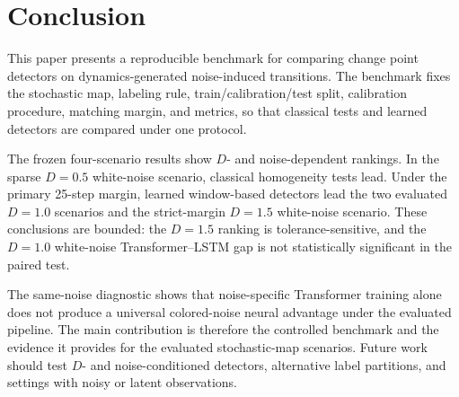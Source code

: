 \section{Conclusion}

This paper presents a reproducible benchmark for comparing change point
detectors on dynamics-generated noise-induced transitions. The benchmark fixes
the stochastic map, labeling rule, train/calibration/test split, calibration
procedure, matching margin, and metrics, so that classical tests and learned
detectors are compared under one protocol.

The frozen four-scenario results show \(D\)- and noise-dependent rankings. In
the sparse \(D=0.5\) white-noise scenario, classical homogeneity tests lead.
Under the primary 25-step margin, learned window-based detectors lead the two
evaluated \(D=1.0\) scenarios and the strict-margin \(D=1.5\) white-noise
scenario. These conclusions are bounded: the \(D=1.5\) ranking is
tolerance-sensitive, and the \(D=1.0\) white-noise Transformer--LSTM gap is not
statistically significant in the paired test.

The same-noise diagnostic shows that noise-specific Transformer training alone
does not produce a universal colored-noise neural advantage under the evaluated
pipeline. The main contribution is therefore the controlled benchmark and the
evidence it provides for the evaluated stochastic-map scenarios. Future work
should test \(D\)- and noise-conditioned detectors, alternative label
partitions, and settings with noisy or latent observations.

